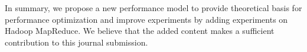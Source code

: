 \documentclass [14pt,journal,compsoc]{article}
\begin{document}
In summary, we propose a new performance model to provide theoretical basis for performance optimization and improve experiments by adding experiments on Hadoop MapReduce. 
We believe that the added content makes a sufficient contribution to this journal submission.



\end{document}
